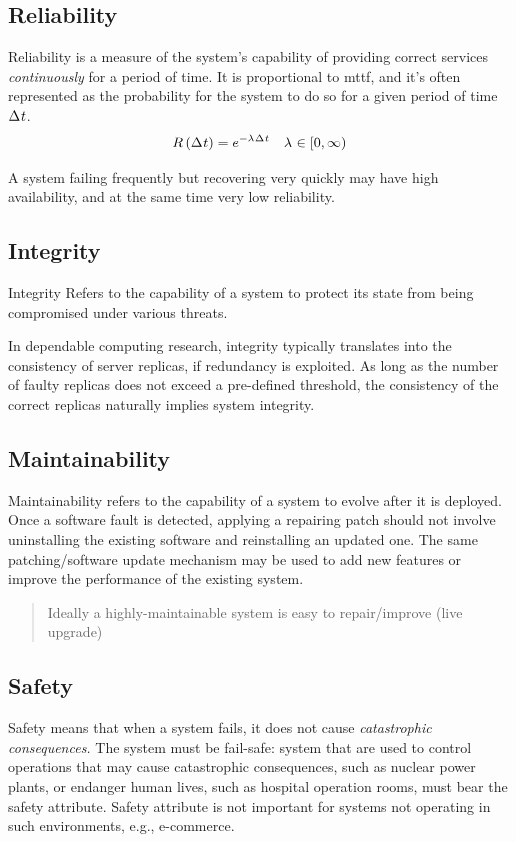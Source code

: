 \documentclass[11pt, a4paper]{article}
\begin{document}
\subsection{Reliability}\label{sub:reliability} %
Reliability is a measure of the system's capability of providing correct services \textit{continuously} for a period of time.
It is proportional to \ac{mttf}, and it's often represented as the probability for the system to do so for a given period of time ${\Delta}^{} t$.
\begin{equation*}
    R\left({{\Delta}^{} t}\right) = {e}^{-{\lambda}^{} {\Delta}^{} t} \quad {\lambda}^{} \in \left[{0, \infty}\right)
\end{equation*}
\begin{warning}
    A system failing frequently but recovering very quickly may have high availability, and at the same time very low reliability.
\end{warning}
\subsection{Integrity}\label{sub:integrity} %
\begin{definition}{Integrity}{}
    Refers to the capability of a system to protect its state from being compromised under various threats.
\end{definition}
In dependable computing research, integrity typically translates into the consistency of server replicas, if redundancy is exploited.
As long as the number of faulty replicas does not exceed a pre-defined threshold, the consistency of the correct replicas naturally implies system integrity.
\subsection{Maintainability}\label{sub:maintainability} %
Maintainability refers to the capability of a system to evolve after it is deployed.
Once a software fault is detected, applying a repairing patch should not involve uninstalling the existing software and reinstalling an updated one. The same patching/software update mechanism may be used to add new features or improve the performance of the existing system.
\begin{quote}
    Ideally a highly-maintainable system is easy to repair/improve (live upgrade)
\end{quote}
\subsection{Safety}\label{sub:safety} %
Safety means that when a system fails, it does not cause \textit{catastrophic consequences.}
The system must be fail-safe: system that are used to control operations that may cause catastrophic consequences, such as nuclear power plants, or endanger human lives, such as hospital operation rooms, must bear the safety attribute.
Safety attribute is not important for systems not operating in such environments, e.g., e-commerce.
%
\end{document}

